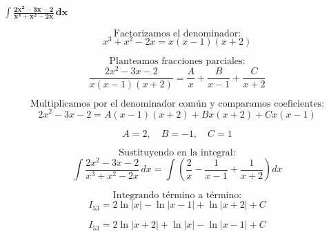 $\displaystyle \mathbf{\int \frac{2x^{2} - 3x - 2}{x^{3} + x^{2} - 2x}\,dx}$

\nopagebreak
\[
\text{Factorizamos el denominador:}
\]
\[
x^{3} + x^{2} - 2x = x(x - 1)(x + 2)
\]

\[
\text{Planteamos fracciones parciales:}
\]
\[
\frac{2x^{2} - 3x - 2}{x(x - 1)(x + 2)}
= \frac{A}{x} + \frac{B}{x - 1} + \frac{C}{x + 2}
\]

\[
\text{Multiplicamos por el denominador común y comparamos coeficientes:}
\]
\[
2x^{2} - 3x - 2 = A(x - 1)(x + 2) + B x(x + 2) + C x(x - 1)
\]

\[
A = 2, \quad B = -1, \quad C = 1
\]

\[
\text{Sustituyendo en la integral:}
\]
\[
\int \frac{2x^{2} - 3x - 2}{x^{3} + x^{2} - 2x}\,dx
= \int\!\left(\frac{2}{x} - \frac{1}{x - 1} + \frac{1}{x + 2}\right)dx
\]

\[
\text{Integrando término a término:}
\]
\[
I_{53} = 2\ln|x| - \ln|x - 1| + \ln|x + 2| + C
\]

\[
\boxed{\displaystyle
I_{53} = 2\ln|x + 2| + \ln|x| - \ln|x - 1| + C
}
\]
